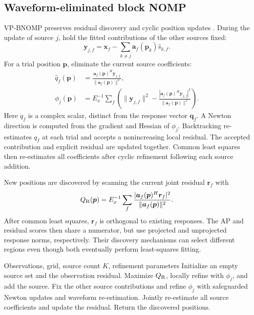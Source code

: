\documentclass[a4paper,fleqn,review]{cas-sc}
\begin{document}
\subsection{Waveform-eliminated block NOMP}
VP-BNOMP preserves residual discovery and cyclic position updates \cite{Mamandipoor2016,Yang2022}. During the update of source $j$, hold the fitted contributions of the other sources fixed:
\begin{equation}
\bm y_{j,f}=\bm x_f-\sum_{k\ne j}\bm a_f(\bm p_k)\widehat s_{k,f}.
\end{equation}
For a trial position $\bm p$, eliminate the current source coefficients:
\begin{align}
\widehat q_f(\bm p)&=\frac{\bm a_f(\bm p)^H\bm y_{j,f}}{\|\bm a_f(\bm p)\|^2},\\
\phi_j(\bm p)&=E_x^{-1}\sum_f\left(\|\bm y_{j,f}\|^2-
 \frac{|\bm a_f(\bm p)^H\bm y_{j,f}|^2}{\|\bm a_f(\bm p)\|^2}\right).
\label{en:local}
\end{align}
Here $q_f$ is a complex scalar, distinct from the response vector $\bm q_f$. A Newton direction is computed from the gradient and Hessian of $\phi_j$. Backtracking re-estimates $q_f$ at each trial and accepts a nonincreasing local residual. The accepted contribution and explicit residual are updated together. Common least squares then re-estimates all coefficients after cyclic refinement following each source addition.

New positions are discovered by scanning the current joint residual $\bm r_f$ with
\begin{equation}
Q_{\rm R}(\bm p)=E_x^{-1}\sum_f
 \frac{|\bm a_f(\bm p)^H\bm r_f|^2}{\|\bm a_f(\bm p)\|^2}.
\end{equation}
After common least squares, $\bm r_f$ is orthogonal to existing responses. The AP and residual scores then share a numerator, but use projected and unprojected response norms, respectively. Their discovery mechanisms can select different regions even though both eventually perform least-squares fitting.

\begin{algorithm}[H]
\caption{VP-BNOMP}\label{en:algnomp}
\begin{algorithmic}[1]
\Require Observations, grid, source count $K$, refinement parameters
\State Initialize an empty source set and the observation residual.
\State Maximize $Q_{\rm R}$, locally refine with $\phi_j$, and add the source.
\Repeat
{}
\State Fix the other source contributions and refine $\phi_j$ with safeguarded Newton updates and waveform re-estimation.
\EndFor
{}
\State Jointly re-estimate all source coefficients and update the residual.
\EndFor
\State Return the discovered positions.
\end{algorithmic}
\end{algorithm}
\end{document}
